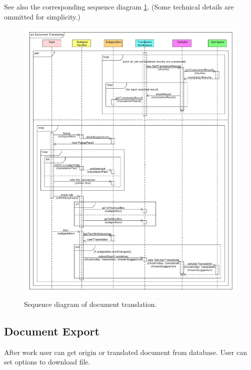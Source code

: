 See also the corresponding sequence diagram \ref{gui:sd:document_translation}.
(Some technical details are ommitted for simplicity.)

\begin{figure}[h]
\begin{center}
\includegraphics[scale=0.45]{figures/document_translation_sequence.pdf}
\end{center}
\caption{Sequence diagram of document translation.}\label{gui:sd:document_translation}
\end{figure}

\subsection{Document Export}

After work user can get origin or translated document from database.  User can set options to download file.
  


